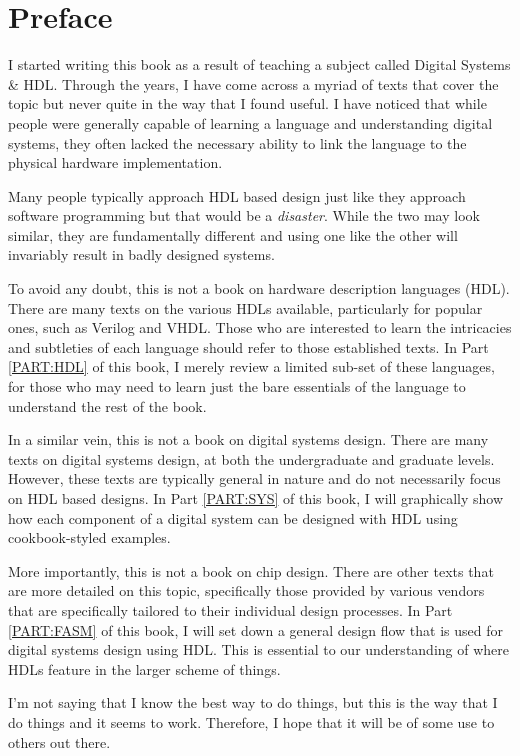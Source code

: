 \chapter*{Preface}

I started writing this book as a result of teaching a subject called Digital Systems \& HDL.
Through the years, I have come across a myriad of texts that cover the topic but never quite in the way that I found useful.
I have noticed that while people were generally capable of learning a language and understanding digital systems, they often lacked the necessary ability to link the language to the physical hardware implementation.


Many people typically approach HDL based design just like they approach software programming but that would be a \emph{disaster}.
While the two may look similar, they are fundamentally different and using one like the other will invariably result in badly designed systems.

To avoid any doubt, this is not a book on hardware description languages (HDL).
There are many texts on the various HDLs available, particularly for popular ones, such as Verilog and VHDL.
Those who are interested to learn the intricacies and subtleties of each language should refer to those established texts.
In Part \ref{PART:HDL} of this book, I merely review a limited sub-set of these languages, for those who may need to learn just the bare essentials of the language to understand the rest of the book.

In a similar vein, this is not a book on digital systems design.
There are many texts on digital systems design, at both the undergraduate and graduate levels.
However, these texts are typically general in nature and do not necessarily focus on HDL based designs.
In Part \ref{PART:SYS} of this book, I will graphically show how each component of a digital system can be designed with HDL using cookbook-styled examples.

More importantly, this is not a book on chip design.
There are other texts that are more detailed on this topic, specifically those provided by various vendors that are specifically tailored to their individual design processes.
In Part \ref{PART:FASM} of this book, I will set down a general design flow that is used for digital systems design using HDL.
This is essential to our understanding of where HDLs feature in the larger scheme of things.


I'm not saying that I know the best way to do things, but this is the way that I do things and it seems to work.
Therefore, 
I hope that it will be of some use to others out there.
